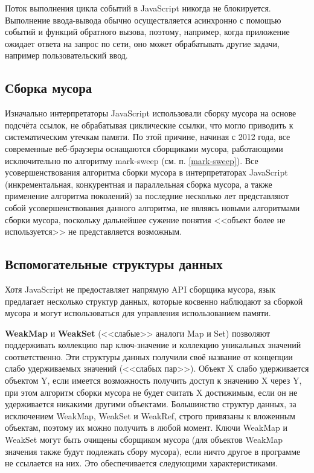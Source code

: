Поток выполнения цикла событий в JavaScript никогда не блокируется. Выполнение ввода-вывода обычно осуществляется асинхронно с помощью событий и функций обратного вызова, поэтому, например, когда приложение ожидает ответа на запрос по сети, оно может обрабатывать другие задачи, например пользовательский ввод. \cite{js_event_loop}



\subsection{Сборка мусора}

Изначально интерпретаторы JavaScript использовали сборку мусора на основе подсчёта ссылок, не обрабатывая циклические ссылки, что могло приводить к систематическим утечкам памяти. По этой причине, начиная с 2012 года, все современные веб-браузеры оснащаются сборщиками мусора, работающими исключительно по алгоритму mark-sweep (см. п. \ref{mark-sweep}). Все усовершенствования алгоритма сборки мусора в интерпретаторах JavaScript (инкрементальная, конкурентная и параллельная сборка мусора, а также применение алгоритма поколений) за последние несколько лет представляют собой усовершенствования данного алгоритма, не являясь новыми алгоритмами сборки мусора, поскольку дальнейшее сужение понятия <<объект более не используется>> не представляется возможным. \cite{js_memory}



\subsection{Вспомогательные структуры данных}

Хотя JavaScript не предоставляет напрямую API сборщика мусора, язык предлагает несколько структур данных, которые косвенно наблюдают за сборкой мусора и могут использоваться для управления использованием памяти.~\cite{js_memory}

\textbf{WeakMap} и \textbf{WeakSet} (<<слабые>> аналоги Map и Set) позволяют поддерживать коллекцию пар ключ-значение и коллекцию уникальных значений соответственно. Эти структуры данных получили своё название от концепции слабо удерживаемых значений (<<слабых пар>>). Объект X слабо удерживается объектом Y, если имеется возможность получить доступ к значению X через Y, при этом алгоритм сборки мусора не будет считать X достижимым, если он не удерживается никакими другими объектами. Большинство структур данных, за исключением WeakMap, WeakSet и WeakRef, строго привязаны к вложенным объектам, поэтому их можно получить в любой момент. Ключи WeakMap и WeakSet могут быть очищены сборщиком мусора (для объектов WeakMap значения также будут подлежать сбору мусора), если ничто другое в программе не ссылается на них. Это обеспечивается следующими характеристиками. \cite{js_memory}

